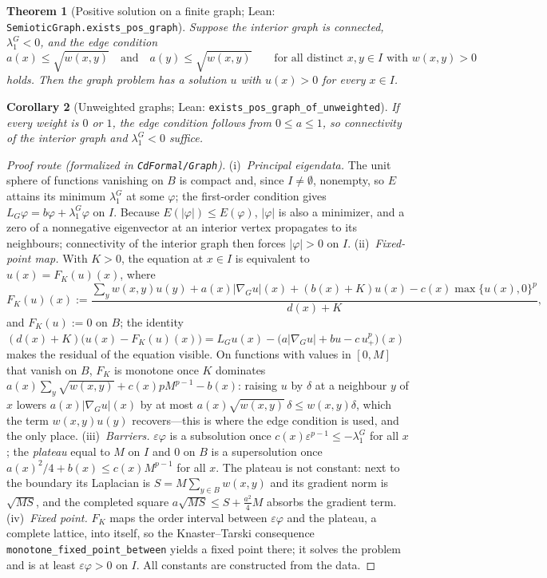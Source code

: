 \documentclass[11pt]{article}
\theoremstyle{plain}
\newtheorem{theorem}{Theorem}[section]
\newtheorem{corollary}[theorem]{Corollary}
\theoremstyle{definition}
\theoremstyle{remark}
\begin{document}
\begin{theorem}[Positive solution on a finite graph; Lean: \texttt{SemioticGraph.exists\_pos\_graph}]\label{thm:graphExistence}
Suppose the interior graph is connected, \(\lambda_1^G<0\), and the \emph{edge condition}
\[
a(x)\le\sqrt{w(x,y)}\quad\text{and}\quad a(y)\le\sqrt{w(x,y)}\qquad\text{for all distinct }x,y\in I\text{ with }w(x,y)>0
\]
holds. Then the graph problem has a solution \(u\) with \(u(x)>0\) for every \(x\in I\).
\end{theorem}
\begin{corollary}[Unweighted graphs; Lean: \texttt{exists\_pos\_graph\_of\_unweighted}]\label{cor:graphUnweighted}
If every weight is \(0\) or \(1\), the edge condition follows from \(0\le a\le 1\), so connectivity of the interior graph and \(\lambda_1^G<0\) suffice.
\end{corollary}

\begin{proof}[Proof route (formalized in \texttt{CdFormal/Graph})]
(i)~\emph{Principal eigendata.} The unit sphere of functions vanishing on \(B\) is compact and, since \(I\ne\emptyset\), nonempty, so \(E\) attains its minimum \(\lambda_1^G\) at some \(\varphi\); the first-order condition gives \(L_G\varphi=b\varphi+\lambda_1^G\varphi\) on \(I\). Because \(E(|\varphi|)\le E(\varphi)\), \(|\varphi|\) is also a minimizer, and a zero of a nonnegative eigenvector at an interior vertex propagates to its neighbours; connectivity of the interior graph then forces \(|\varphi|>0\) on \(I\).
(ii)~\emph{Fixed-point map.} With \(K>0\), the equation at \(x\in I\) is equivalent to \(u(x)=F_K(u)(x)\), where
\[
F_K(u)(x):=\frac{\sum_yw(x,y)u(y)+a(x)|\nabla_Gu|(x)+(b(x)+K)u(x)-c(x)\max\{u(x),0\}^p}{d(x)+K},
\]
and \(F_K(u):=0\) on \(B\); the identity \((d(x)+K)\big(u(x)-F_K(u)(x)\big)=L_Gu(x)-\big(a|\nabla_Gu|+bu-c\,u_+^p\big)(x)\) makes the residual of the equation visible. On functions with values in \([0,M]\) that vanish on \(B\), \(F_K\) is monotone once \(K\) dominates \(a(x)\sum_y\sqrt{w(x,y)}+c(x)pM^{p-1}-b(x)\): raising \(u\) by \(\delta\) at a neighbour \(y\) of \(x\) lowers \(a(x)|\nabla_Gu|(x)\) by at most \(a(x)\sqrt{w(x,y)}\,\delta\le w(x,y)\delta\), which the term \(w(x,y)u(y)\) recovers---this is where the edge condition is used, and the only place.
(iii)~\emph{Barriers.} \(\varepsilon\varphi\) is a subsolution once \(c(x)\varepsilon^{p-1}\le-\lambda_1^G\) for all \(x\); the \emph{plateau} equal to \(M\) on \(I\) and \(0\) on \(B\) is a supersolution once \(a(x)^2/4+b(x)\le c(x)M^{p-1}\) for all \(x\). The plateau is not constant: next to the boundary its Laplacian is \(S=M\sum_{y\in B}w(x,y)\) and its gradient norm is \(\sqrt{MS}\), and the completed square \(a\sqrt{MS}\le S+\tfrac{a^2}{4}M\) absorbs the gradient term.
(iv)~\emph{Fixed point.} \(F_K\) maps the order interval between \(\varepsilon\varphi\) and the plateau, a complete lattice, into itself, so the Knaster--Tarski consequence \texttt{monotone\_fixed\_point\_between} yields a fixed point there; it solves the problem and is at least \(\varepsilon\varphi>0\) on \(I\). All constants are constructed from the data.
\end{proof}
\end{document}
